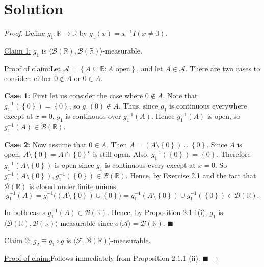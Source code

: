 \documentclass[12pt]{article}
\newenvironment{claimproof}[1]{\par\noindent\underline{Proof of claim:}\space#1}{\hfill $\blacksquare$}
\begin{document}
\section*{Solution}

\begin{proof}
Define $g_1 : \mathbb{R} \rightarrow \mathbb{R}$ by $g_1(x) = x^{-1}I(x \neq 0)$.

\underline{Claim 1:} $g_1$ is $\langle\mathcal{B}(\mathbb{R}), \mathcal{B}(\mathbb{R})\rangle$-measurable.

\begin{claimproof}
Let $\mathcal{A} = \left\{ A\subseteq \mathbb{R} : A \text{ open} \right\}$, and let $A \in \mathcal{A}$. There are two cases to consider: either $0
\notin A$ or $0 \in A$.

{\bf Case 1:} First let us consider the case where $0 \notin A$. Note that $g_1^{-1}(\left\{ 0 \right\}) = \left\{ 0 \right\}$, so $g_1(0) \notin A$.
Thus, since $g_1$ is continuous everywhere except at $x = 0$, $g_1$ is continouos over $g_{1}^{-1}(A)$. Hence $g_1^{-1}(A)$ is open, so $g_1^{-1}(A) \in
\mathcal{B}(\mathbb{R})$.

{\bf Case 2:} Now assume that $0 \in A$. Then $A = (A \setminus \left\{ 0 \right\}) \cup \left\{ 0 \right\}$. Since $A$ is open, $A \setminus \left\{
0 \right\} = A \cap \left\{ 0 \right\}^{c}$ is still open. Also, $g_{1}^{-1}(\left\{ 0 \right\}) = \left\{ 0 \right\}$. Therefore $g_{1}^{-1}(A\setminus \left\{ 0 \right\})$ 
is open since $g_{1}$ is continuous every except at $x = 0$. So $g_{1}^{-1}(A\setminus \left\{ 0 \right\}), g_{1}^{-1}(\left\{ 0 \right\}) \in
\mathcal{B}(\mathbb{R})$. Hence, by Exercise 2.1 and the fact that $\mathcal{B}(\mathbb{R})$ is closed under finite unions,
\[ g_{1}^{-1}(A) = g_{1}^{-1}\bigg( (A\setminus \left\{ 0 \right\}) \cup \left\{ 0 \right\}\bigg) = g_{1}^{-1}(A\setminus \left\{ 0 \right\}) \cup
g_{1}^{-1}(\left\{ 0 \right\}) \in \mathcal{B}(\mathbb{R}). \]

In both cases $g_{1}^{-1}(A) \in \mathcal{B}(\mathbb{R})$. Hence, by Proposition 2.1.1(i), $g_{1}$ is $\langle\mathcal{B}(\mathbb{R}),
\mathcal{B}(\mathbb{R})\rangle$-measurable since $\sigma\langle\mathcal{A}\rangle = \mathcal{B}(\mathbb{R})$.
\end{claimproof}

\underline{Claim 2:} $g_{2} \equiv g_{1} \circ g$ is $\langle\mathcal{F}, \mathcal{B}(\mathbb{R})\rangle$-measurable.

\begin{claimproof}
Follows immediately from Proposition 2.1.1 (ii).
\end{claimproof}


\end{proof}
\end{document}
